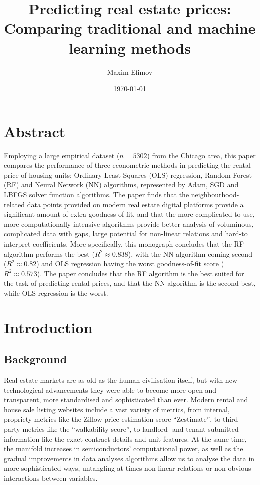 \documentclass[12pt]{report}
\title{Predicting real estate prices: Comparing traditional and machine learning methods}
\author{Maxim Efimov}
\date{\today}
\begin{document}
\maketitle
\tableofcontents
\newpage
{} %
\fontsize{12}{18}\selectfont %
\renewcommand{\footnotesize}{\fontsize{10}{12}\selectfont} %


\newpage

\section*{Abstract}
Employing a large empirical dataset ($n=5302$) from the Chicago area, this paper compares the performance of three econometric methods in predicting the rental price of housing units: Ordinary Least Squares (OLS) regression, Random Forest (RF) and Neural Network (NN) algorithms, represented by Adam, SGD and LBFGS solver function algorithms. The paper finds that the neighbourhood-related data points provided on modern real estate digital platforms provide a significant amount of extra goodness of fit, and that the more complicated to use, more computationally intensive algorithms provide better analysis of voluminous, complicated data with gaps, large potential for non-linear relations and hard-to interpret coefficients. More specifically, this monograph concludes that the RF algorithm performs the best ($R^2\approx 0.838$), with the NN algorithm coming second ($R^2\approx 0.82$) and OLS regression having the worst goodness-of-fit score ($R^2\approx 0.573$). The paper concludes that the RF algorithm is the best suited for the task of predicting rental prices, and that the NN algorithm is the second best, while OLS regression is the worst.


\section{Introduction}
\subsection{Background}

Real estate markets are as old as the human civilisation itself, but with new technological advancements they were able to become more open and transparent, more standardised and sophisticated than ever. Modern rental and house sale listing websites include a vast variety of metrics, from internal, propriety metrics like the Zillow price estimation score “Zestimate”, to third-party metrics like the “walkability score”, to landlord- and tenant-submitted information like the exact contract details and unit features. At the same time, the manifold increases in semiconductors’ computational power, as well as the gradual improvements in data analyses algorithms allow us to analyse the data in more sophisticated ways, untangling at times non-linear relations or non-obvious interactions between variables.
\end{document}
